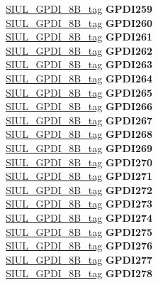\begin{DoxyCompactItemize}
\begin{tabbing}
\>\>\mbox{\hyperlink{unionSIUL__GPDI__8B__tag}{SIUL\_GPDI\_8B\_tag}} {\bfseries GPDI259}\\
\>\>\mbox{\hyperlink{unionSIUL__GPDI__8B__tag}{SIUL\_GPDI\_8B\_tag}} {\bfseries GPDI260}\\
\>\>\mbox{\hyperlink{unionSIUL__GPDI__8B__tag}{SIUL\_GPDI\_8B\_tag}} {\bfseries GPDI261}\\
\>\>\mbox{\hyperlink{unionSIUL__GPDI__8B__tag}{SIUL\_GPDI\_8B\_tag}} {\bfseries GPDI262}\\
\>\>\mbox{\hyperlink{unionSIUL__GPDI__8B__tag}{SIUL\_GPDI\_8B\_tag}} {\bfseries GPDI263}\\
\>\>\mbox{\hyperlink{unionSIUL__GPDI__8B__tag}{SIUL\_GPDI\_8B\_tag}} {\bfseries GPDI264}\\
\>\>\mbox{\hyperlink{unionSIUL__GPDI__8B__tag}{SIUL\_GPDI\_8B\_tag}} {\bfseries GPDI265}\\
\>\>\mbox{\hyperlink{unionSIUL__GPDI__8B__tag}{SIUL\_GPDI\_8B\_tag}} {\bfseries GPDI266}\\
\>\>\mbox{\hyperlink{unionSIUL__GPDI__8B__tag}{SIUL\_GPDI\_8B\_tag}} {\bfseries GPDI267}\\
\>\>\mbox{\hyperlink{unionSIUL__GPDI__8B__tag}{SIUL\_GPDI\_8B\_tag}} {\bfseries GPDI268}\\
\>\>\mbox{\hyperlink{unionSIUL__GPDI__8B__tag}{SIUL\_GPDI\_8B\_tag}} {\bfseries GPDI269}\\
\>\>\mbox{\hyperlink{unionSIUL__GPDI__8B__tag}{SIUL\_GPDI\_8B\_tag}} {\bfseries GPDI270}\\
\>\>\mbox{\hyperlink{unionSIUL__GPDI__8B__tag}{SIUL\_GPDI\_8B\_tag}} {\bfseries GPDI271}\\
\>\>\mbox{\hyperlink{unionSIUL__GPDI__8B__tag}{SIUL\_GPDI\_8B\_tag}} {\bfseries GPDI272}\\
\>\>\mbox{\hyperlink{unionSIUL__GPDI__8B__tag}{SIUL\_GPDI\_8B\_tag}} {\bfseries GPDI273}\\
\>\>\mbox{\hyperlink{unionSIUL__GPDI__8B__tag}{SIUL\_GPDI\_8B\_tag}} {\bfseries GPDI274}\\
\>\>\mbox{\hyperlink{unionSIUL__GPDI__8B__tag}{SIUL\_GPDI\_8B\_tag}} {\bfseries GPDI275}\\
\>\>\mbox{\hyperlink{unionSIUL__GPDI__8B__tag}{SIUL\_GPDI\_8B\_tag}} {\bfseries GPDI276}\\
\>\>\mbox{\hyperlink{unionSIUL__GPDI__8B__tag}{SIUL\_GPDI\_8B\_tag}} {\bfseries GPDI277}\\
\>\>\mbox{\hyperlink{unionSIUL__GPDI__8B__tag}{SIUL\_GPDI\_8B\_tag}} {\bfseries GPDI278}\\

\end{tabbing}
\end{DoxyCompactItemize}
